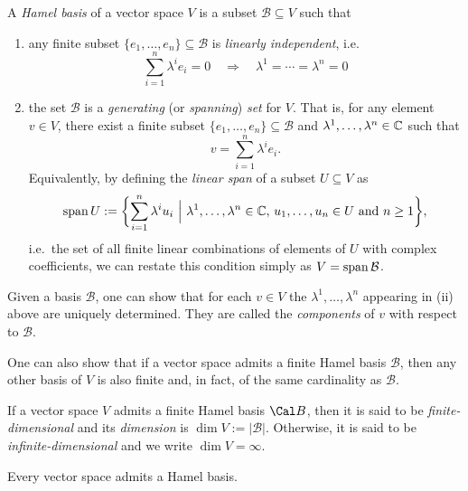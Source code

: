 \begin{definition}
A \emph{Hamel basis} of a vector space $V$ is a subset $\mathcal{B}\subseteq V$ such that
\begin{enumerate}[label=(\roman*)]
\item any finite subset $\{e_1,\ldots,e_n\}\subseteq \mathcal{B}$ is \emph{linearly independent}, i.e.\
\begin{equation*}
\sum_{i=1}^n\lambda^ie_i = 0 \quad \Rightarrow \quad \lambda^1=\cdots = \lambda^n=0
\end{equation*}
\item the set $\mathcal{B}$ is a \emph{generating} (or \emph{spanning}) \emph{set} for $V$. That is, for any element $v\in V$, there exist a finite subset $\{e_1,\ldots,e_n\}\subseteq \mathcal{B}$ and $\lambda^1,\ldots,\lambda^n\in\mathbb{C}$ such that
\begin{equation*}
v = \sum_{i=1}^n\lambda^ie_i.
\end{equation*}
Equivalently, by defining the \emph{linear span} of a subset $U\subseteq V$ as
\begin{equation*}
\lspan U := \biggl\{\sum_{i=1}^n\lambda^iu_i\ \Big|\ \lambda^1,\ldots,\lambda^n\in\C,\, u_1,\ldots,u_n\in U \text{ and } n\geq 1\biggr\},
\end{equation*}
i.e.\ the set of all finite linear combinations of elements of $U$ with complex coefficients, we can restate this condition simply as $V = \operatorname{span} \mathcal{B}$.
\end{enumerate}
\end{definition}
Given a basis $\mathcal{B}$, one can show that for each $v\in V$ the $\lambda^1,\ldots,\lambda^n$ appearing in (ii) above are uniquely determined. They are called the \emph{components} of $v$ with respect to $\mathcal{B}$. 

One can also show that if a vector space admits a finite Hamel basis
$\mathcal{B}$, then any other basis of $V$ is also finite and, in
fact, of the same cardinality as $\mathcal{B}$.

\begin{definition}
If a vector space $V$ admits a finite Hamel basis \(\Cal B\), then it
is said to
be \emph{finite-dimensional} and its \emph{dimension} is $\dim V :=
|\mathcal{B}|$. Otherwise, it is said to be
\emph{infinite-dimensional} and we write $\dim V = \infty$.
\end{definition}

\begin{theorem}
Every vector space admits a Hamel basis.
\end{theorem}

